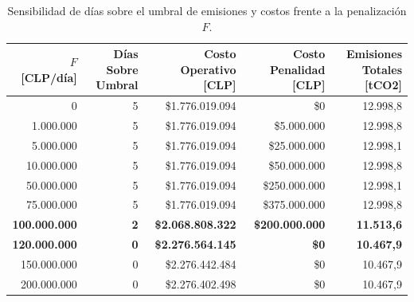 \documentclass[10pt,letterpaper]{article}
\begin{document}
\begin{table}[H]
\centering
\caption{Sensibilidad de días sobre el umbral de emisiones y costos frente a la penalización $F$.}
\label{tab:F_sweep}
\setlength{\tabcolsep}{4pt}
\small
\begin{tabular}{rrrrr}
\toprule
$F$ \textbf{[CLP/día]} & \textbf{Días Sobre Umbral} & \textbf{Costo Operativo [CLP]} & \textbf{Costo Penalidad [CLP]} & \textbf{Emisiones Totales [tCO2]} \\
\midrule
0 & 5 & \$1.776.019.094 & \$0 & 12.998,8 \\
1.000.000 & 5 & \$1.776.019.094 & \$5.000.000 & 12.998,8 \\
5.000.000 & 5 & \$1.776.019.094 & \$25.000.000 & 12.998,1 \\
10.000.000 & 5 & \$1.776.019.094 & \$50.000.000 & 12.998,8 \\
50.000.000 & 5 & \$1.776.019.094 & \$250.000.000 & 12.998,1 \\
75.000.000 & 5 & \$1.776.019.094 & \$375.000.000 & 12.998,8 \\
\textbf{100.000.000} & \textbf{2} & \textbf{\$2.068.808.322} & \textbf{\$200.000.000} & \textbf{11.513,6} \\
\textbf{120.000.000} & \textbf{0} & \textbf{\$2.276.564.145} & \textbf{\$0} & \textbf{10.467,9} \\
150.000.000 & 0 & \$2.276.442.484 & \$0 & 10.467,9 \\
200.000.000 & 0 & \$2.276.402.498 & \$0 & 10.467,9 \\
\bottomrule
\end{tabular}
\end{table}
\end{document}
